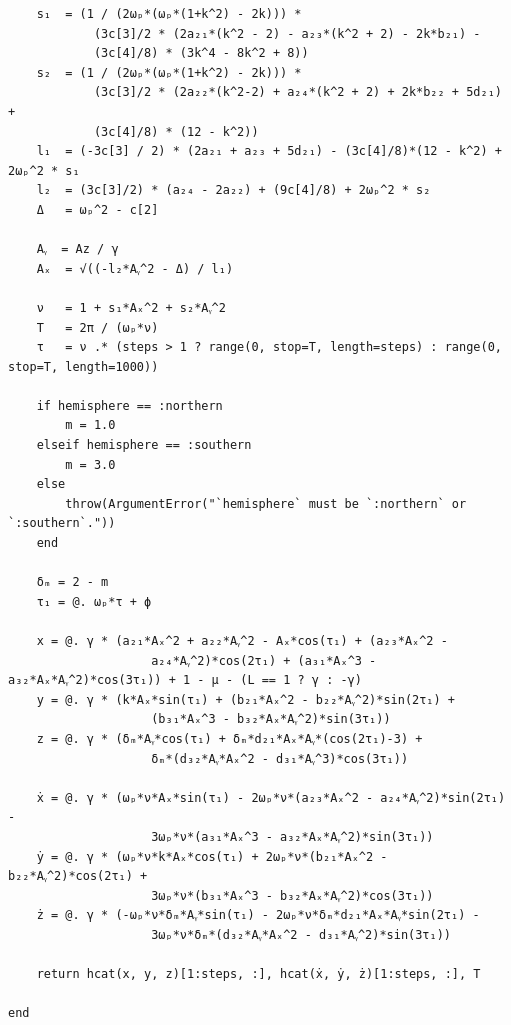 \documentclass[conf]{new-aiaa}
\begin{document}
\begin{verbatim}
    s₁  = (1 / (2ωₚ*(ωₚ*(1+k^2) - 2k))) * 
            (3c[3]/2 * (2a₂₁*(k^2 - 2) - a₂₃*(k^2 + 2) - 2k*b₂₁) - 
            (3c[4]/8) * (3k^4 - 8k^2 + 8))
    s₂  = (1 / (2ωₚ*(ωₚ*(1+k^2) - 2k))) * 
            (3c[3]/2 * (2a₂₂*(k^2-2) + a₂₄*(k^2 + 2) + 2k*b₂₂ + 5d₂₁) + 
            (3c[4]/8) * (12 - k^2))
    l₁  = (-3c[3] / 2) * (2a₂₁ + a₂₃ + 5d₂₁) - (3c[4]/8)*(12 - k^2) + 2ωₚ^2 * s₁
    l₂  = (3c[3]/2) * (a₂₄ - 2a₂₂) + (9c[4]/8) + 2ωₚ^2 * s₂
    Δ   = ωₚ^2 - c[2]

    Aᵧ  = Az / γ
    Aₓ  = √((-l₂*Aᵧ^2 - Δ) / l₁)

    ν   = 1 + s₁*Aₓ^2 + s₂*Aᵧ^2
    Τ   = 2π / (ωₚ*ν)
    τ   = ν .* (steps > 1 ? range(0, stop=Τ, length=steps) : range(0, stop=Τ, length=1000))

    if hemisphere == :northern
        m = 1.0
    elseif hemisphere == :southern
        m = 3.0
    else
        throw(ArgumentError("`hemisphere` must be `:northern` or `:southern`."))
    end

    δₘ = 2 - m
    τ₁ = @. ωₚ*τ + ϕ

    x = @. γ * (a₂₁*Aₓ^2 + a₂₂*Aᵧ^2 - Aₓ*cos(τ₁) + (a₂₃*Aₓ^2 - 
                    a₂₄*Aᵧ^2)*cos(2τ₁) + (a₃₁*Aₓ^3 - a₃₂*Aₓ*Aᵧ^2)*cos(3τ₁)) + 1 - μ - (L == 1 ? γ : -γ)
    y = @. γ * (k*Aₓ*sin(τ₁) + (b₂₁*Aₓ^2 - b₂₂*Aᵧ^2)*sin(2τ₁) + 
                    (b₃₁*Aₓ^3 - b₃₂*Aₓ*Aᵧ^2)*sin(3τ₁))
    z = @. γ * (δₘ*Aᵧ*cos(τ₁) + δₘ*d₂₁*Aₓ*Aᵧ*(cos(2τ₁)-3) + 
                    δₘ*(d₃₂*Aᵧ*Aₓ^2 - d₃₁*Aᵧ^3)*cos(3τ₁))

    ẋ = @. γ * (ωₚ*ν*Aₓ*sin(τ₁) - 2ωₚ*ν*(a₂₃*Aₓ^2 - a₂₄*Aᵧ^2)*sin(2τ₁) - 
                    3ωₚ*ν*(a₃₁*Aₓ^3 - a₃₂*Aₓ*Aᵧ^2)*sin(3τ₁))
    ẏ = @. γ * (ωₚ*ν*k*Aₓ*cos(τ₁) + 2ωₚ*ν*(b₂₁*Aₓ^2 - b₂₂*Aᵧ^2)*cos(2τ₁) + 
                    3ωₚ*ν*(b₃₁*Aₓ^3 - b₃₂*Aₓ*Aᵧ^2)*cos(3τ₁))
    ż = @. γ * (-ωₚ*ν*δₘ*Aᵧ*sin(τ₁) - 2ωₚ*ν*δₘ*d₂₁*Aₓ*Aᵧ*sin(2τ₁) - 
                    3ωₚ*ν*δₘ*(d₃₂*Aᵧ*Aₓ^2 - d₃₁*Aᵧ^2)*sin(3τ₁))

    return hcat(x, y, z)[1:steps, :], hcat(ẋ, ẏ, ż)[1:steps, :], Τ

end
\end{verbatim}

\newpage
\end{document}
